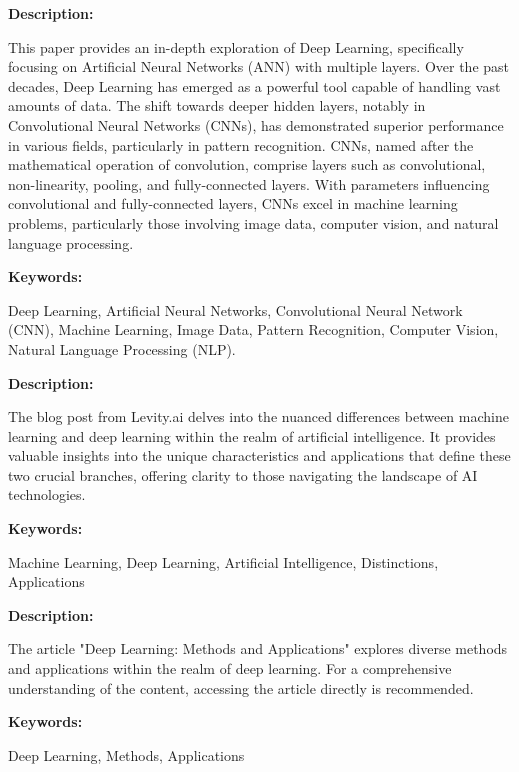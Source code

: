 { 
	
	\textbf{Description:}
	
	This paper provides an in-depth exploration of Deep Learning, specifically focusing on Artificial Neural Networks (ANN) with multiple layers. Over the past decades, Deep Learning has emerged as a powerful tool capable of handling vast amounts of data. The shift towards deeper hidden layers, notably in Convolutional Neural Networks (CNNs), has demonstrated superior performance in various fields, particularly in pattern recognition. CNNs, named after the mathematical operation of convolution, comprise layers such as convolutional, non-linearity, pooling, and fully-connected layers. With parameters influencing convolutional and fully-connected layers, CNNs excel in machine learning problems, particularly those involving image data, computer vision, and natural language processing.\autocite{Albawi:2017}

	
	
	\textbf{Keywords:} 
	
	Deep Learning, Artificial Neural Networks, Convolutional Neural Network (CNN), Machine Learning, Image Data, Pattern Recognition, Computer Vision, Natural Language Processing (NLP).

}



{ 
	
	\textbf{Description:}
	
	The blog post from Levity.ai delves into the nuanced differences between machine learning and deep learning within the realm of artificial intelligence. It provides valuable insights into the unique characteristics and applications that define these two crucial branches, offering clarity to those navigating the landscape of AI technologies.\autocite{Arne:2022}


	\textbf{Keywords:} 
	
	Machine Learning, Deep Learning, Artificial Intelligence, Distinctions, Applications

	
}



{ 
	
	\textbf{Description:}
	
	The article "Deep Learning: Methods and Applications" explores diverse methods and applications within the realm of deep learning. For a comprehensive understanding of the content, accessing the article directly is recommended.\autocite{Deng:2014}
	
	\textbf{Keywords:} 
	
	Deep Learning, Methods, Applications

	
}




